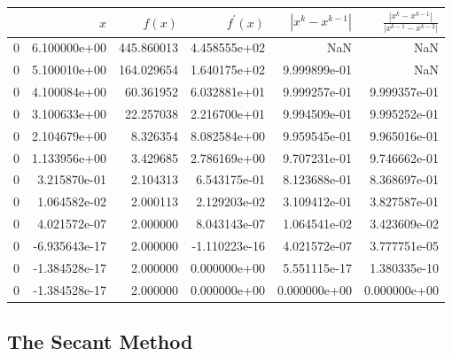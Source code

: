 \begin{tabular}{lrrrrr}
\toprule
{} &           $x$ &      $f(x)$ &  $f^\prime(x)$ &  $|x^k - x^{k-1}|$ &  $\frac{|x^ k - x^{k-1}|}{|x^{k-1} - x^{k-2}|}$ \\
\midrule
0 &  6.100000e+00 &  445.860013 &   4.458555e+02 &                NaN &                                            NaN \\
0 &  5.100010e+00 &  164.029654 &   1.640175e+02 &       9.999899e-01 &                                            NaN \\
0 &  4.100084e+00 &   60.361952 &   6.032881e+01 &       9.999257e-01 &                                   9.999357e-01 \\
0 &  3.100633e+00 &   22.257038 &   2.216700e+01 &       9.994509e-01 &                                   9.995252e-01 \\
0 &  2.104679e+00 &    8.326354 &   8.082584e+00 &       9.959545e-01 &                                   9.965016e-01 \\
0 &  1.133956e+00 &    3.429685 &   2.786169e+00 &       9.707231e-01 &                                   9.746662e-01 \\
0 &  3.215870e-01 &    2.104313 &   6.543175e-01 &       8.123688e-01 &                                   8.368697e-01 \\
0 &  1.064582e-02 &    2.000113 &   2.129203e-02 &       3.109412e-01 &                                   3.827587e-01 \\
0 &  4.021572e-07 &    2.000000 &   8.043143e-07 &       1.064541e-02 &                                   3.423609e-02 \\
0 & -6.935643e-17 &    2.000000 &  -1.110223e-16 &       4.021572e-07 &                                   3.777751e-05 \\
0 & -1.384528e-17 &    2.000000 &   0.000000e+00 &       5.551115e-17 &                                   1.380335e-10 \\
0 & -1.384528e-17 &    2.000000 &   0.000000e+00 &       0.000000e+00 &                                   0.000000e+00\\
\hline
\end{tabular}

\subsection*{The Secant Method} %

